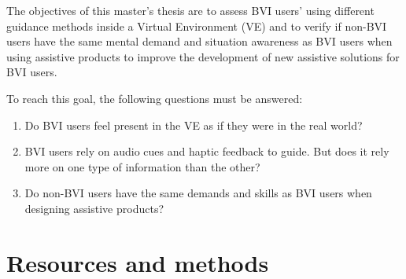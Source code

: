 
 The objectives of this master's thesis are to assess BVI users' using different guidance methods inside a Virtual Environment (VE) and to verify if non-BVI users have the same mental demand and situation awareness as BVI users when using assistive products to improve the development of new assistive solutions for BVI users.

 
 To reach this goal, the following questions must be answered:
 \begin{enumerate}
     \item Do BVI users feel present in the VE as if they were in the real world? \label{itm:obj_first}
     \item BVI users rely on audio cues and haptic feedback to guide. But does it rely more on one type of information than the other? \label{itm:obj_second}
     \item Do non-BVI users have the same demands and skills as BVI users when designing assistive products? \label{itm:obj_third}
 \end{enumerate}
 
 
 

\section{Resources and methods} 


